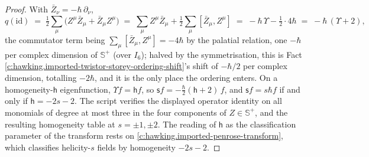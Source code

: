 \documentclass[11pt]{article}
\theoremstyle{definition}
\theoremstyle{plain}
\providecommand{\CS}{}\renewcommand{\CS}{{\mathbb{S}^{+}}}
\providecommand{\id}{}\renewcommand{\id}{\mathrm{id}}
\begin{document}
\begin{proof}
With $\bar Z_\nu = -\hbar\,\partial_\nu$,
\[
q(\id) \;=\; \tfrac12\sum_\mu\bigl(Z^\mu \bar Z_\mu + \bar Z_\mu Z^\mu\bigr)
\;=\; \sum_\mu Z^\mu \bar Z_\mu + \tfrac12\sum_\mu [\bar Z_\mu, Z^\mu]
\;=\; -\hbar\,\Upsilon - \tfrac12\cdot 4\hbar \;=\; -\hbar\,(\Upsilon + 2),
\]
the commutator term being $\sum_\mu[\bar Z_\mu, Z^\mu] = -4\hbar$ by the palatial relation, one $-\hbar$ per complex dimension of $\CS$ (over $I_6$); halved by the symmetrisation, this is Fact \ref{c:hawking.imported-twistor-storey-ordering-shift}'s shift of $-\hbar/2$ per complex dimension, totalling $-2\hbar$, and it is the only place the ordering enters. On a homogeneity-$\mathsf{h}$ eigenfunction, $\Upsilon f = \mathsf{h} f$, so $\mathsf{s} f = -\tfrac{\hbar}{2}(\mathsf{h} + 2)\,f$, and $\mathsf{s} f = s\hbar f$ if and only if $\mathsf{h} = -2s - 2$. The script verifies the displayed operator identity on all monomials of degree at most three in the four components of $Z \in \CS$, and the resulting homogeneity table at $s = \pm 1, \pm 2$. The reading of $\mathsf{h}$ as the classification parameter of the transform rests on \ref{c:hawking.imported-penrose-transform}, which classifies helicity-$s$ fields by homogeneity $-2s-2$.

\end{proof}
\end{document}
